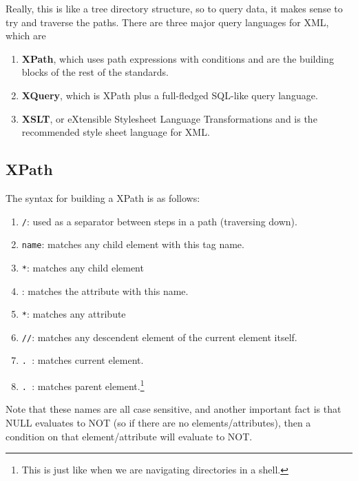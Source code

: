 \documentclass{article}
\begin{document}
  Really, this is like a tree directory structure, so to query data, it makes sense to try and traverse the paths. There are three major query languages for XML, which are 
  \begin{enumerate}
    \item \textbf{XPath}, which uses path expressions with conditions and are the building blocks of the rest of the standards. 
    \item \textbf{XQuery}, which is XPath plus a full-fledged SQL-like query language. 
    \item \textbf{XSLT}, or eXtensible Stylesheet Language Transformations and is the recommended style sheet language for XML. 
  \end{enumerate}

  \subsection{XPath}

    \begin{definition}
      The syntax for building a XPath is as follows: 
      \begin{enumerate}
        \item \texttt{/}: used as a separator between steps in a path (traversing down). 
        \item \texttt{name}: matches any child element with this tag name. 
        \item \texttt{*}: matches any child element 
        \item \texttt{\@name}: matches the attribute with this name. 
        \item \texttt{\@*}: matches any attribute 
        \item \texttt{//}: matches any descendent element of the current element itself. 
        \item \texttt{. }: matches current element.
        \item \texttt{. }: matches parent element.\footnote{This is just like when we are navigating directories in a shell.}
      \end{enumerate}
      Note that these names are all case sensitive, and another important fact is that NULL evaluates to NOT (so if there are no elements/attributes), then a condition on that element/attribute will evaluate to NOT. 
    \end{definition}
\end{document}
